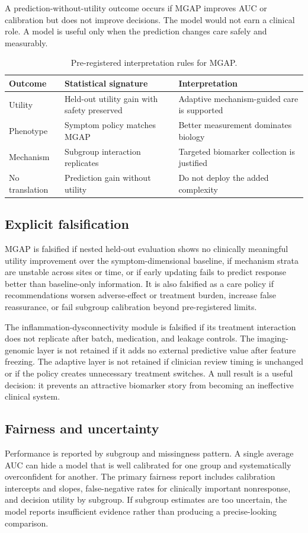 \documentclass[conference]{IEEEtran}
\begin{document}
A prediction-without-utility outcome occurs if MGAP improves AUC or calibration but does not improve decisions. The model would not earn a clinical role. A model is useful only when the prediction changes care safely and measurably.

\begin{table}[t]
\centering
\caption{Pre-registered interpretation rules for MGAP.}
\label{tab:decisions}
\footnotesize
\begin{tabular}{p{2.0cm}p{2.5cm}p{2.5cm}}
\toprule
Outcome & Statistical signature & Interpretation \\
\midrule
Utility & Held-out utility gain with safety preserved & Adaptive mechanism-guided care is supported \\
Phenotype & Symptom policy matches MGAP & Better measurement dominates biology \\
Mechanism & Subgroup interaction replicates & Targeted biomarker collection is justified \\
No translation & Prediction gain without utility & Do not deploy the added complexity \\
\bottomrule
\end{tabular}
\end{table}

\subsection{Explicit falsification}
MGAP is falsified if nested held-out evaluation shows no clinically meaningful utility improvement over the symptom-dimensional baseline, if mechanism strata are unstable across sites or time, or if early updating fails to predict response better than baseline-only information. It is also falsified as a care policy if recommendations worsen adverse-effect or treatment burden, increase false reassurance, or fail subgroup calibration beyond pre-registered limits.

The inflammation-dysconnectivity module is falsified if its treatment interaction does not replicate after batch, medication, and leakage controls. The imaging-genomic layer is not retained if it adds no external predictive value after feature freezing. The adaptive layer is not retained if clinician review timing is unchanged or if the policy creates unnecessary treatment switches. A null result is a useful decision: it prevents an attractive biomarker story from becoming an ineffective clinical system.

\subsection{Fairness and uncertainty}
Performance is reported by subgroup and missingness pattern. A single average AUC can hide a model that is well calibrated for one group and systematically overconfident for another. The primary fairness report includes calibration intercepts and slopes, false-negative rates for clinically important nonresponse, and decision utility by subgroup. If subgroup estimates are too uncertain, the model reports insufficient evidence rather than producing a precise-looking comparison.
\end{document}
